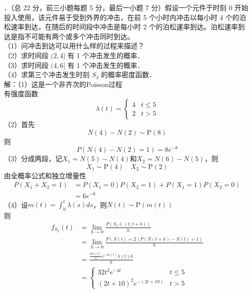 \documentclass[UTF8,openany]{book}
\begin{document}
．（总 22 分，前三小题每题 5 分，最后一小题 7 分）假设一个元件于时刻 0 开始投入使用，该元件易于受到外界的冲击，在前 5 个小时内冲击以每小时 4 个的泊松速率到达，在随后的时间段中冲击是每小时 2 个的泊松速率到达。泊松速率到达是指不可能有两个或多个冲击同时到达。\\
（1）问冲击到达可以用什么样的过程来描述？\\
（2）求时间段 $(2,4]$ 有 1 个冲击发生的概率．\\
（3）求时间段 $(4,6]$ 有 1 个冲击发生的概率．\\
（4）求第三个冲击发生时刻 $S_{3}$ 的概率密度函数．\\
解：（1）这是一个非齐次的Poisson过程\\
有强度函数
\[
\lambda(t)=
\begin{cases}
	4  &  t\le 5 \\
	2  &  t>5
\end{cases}
\]
（2）首先$$N(4)-N(2)\sim \mathrm{P}(8)$$
则
\[
P(N(4)-N(2)=1)=8e^{-8}
\]
（3）分成两段，记$X_1=N(5)-N(4)$和$X_2=N(6)-N(5)$，则
\[
X_1\sim \mathrm{P}(4) \quad X_2 \sim \mathrm{P}(2)
\]
由全概率公式和独立增量性
\begin{align*}
	P(X_1+X_2=1) &= P(X_1=0)P(X_2=1)+P(X_1=1)P(X_2=0) \\
	& =6e^{-6}
\end{align*}
（4）设$m(t)=\int_{0}^{t} \lambda(s)ds$，则$N(t)\sim \mathrm{P}(m(t))$\\
则
\begin{align*}
	f_{S_3}(t) & =\lim_{h\rightarrow 0}\frac{P\left( S_3\in (t,t+h)\right) }{h} \\
	&= \lim_{h\rightarrow 0}\frac{P(N(t)=2)P(N(t+h)-N(t)=1) }{h}\\
	&= \frac{\frac{m^2(t)}{2}e^{-m(t)}\lambda(t)h}{h} \\
	&=
	\begin{cases}
		32t^2 e^{-4t}  &  t \le 5 \\
		(2t+10)^2 e^{-(2t+10)} &  t>5
	\end{cases}
\end{align*}
\end{document}
